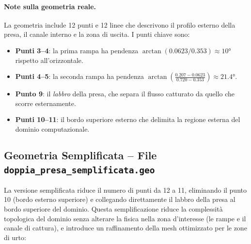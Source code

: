 \paragraph{Note sulla geometria reale.}
La geometria include 12 punti e 12 linee che descrivono il profilo esterno della presa, il
canale interno e la zona di uscita. I punti chiave sono:
\begin{itemize}
  \item \textbf{Punti 3--4}: la prima rampa ha pendenza
    $\arctan(0.0623/0.353) \approx 10°$ rispetto all'orizzontale.
  \item \textbf{Punti 4--5}: la seconda rampa ha pendenza
    $\arctan\!\left(\frac{0.207-0.0623}{0.720-0.353}\right) \approx 21.4°$.
  \item \textbf{Punto 9}: il \emph{labbro} della presa, che separa il flusso catturato da
    quello che scorre esternamente.
  \item \textbf{Punti 10--11}: il bordo superiore esterno che delimita la regione esterna
    del dominio computazionale.
\end{itemize}

\subsection{Geometria Semplificata -- File \texttt{doppia\_presa\_semplificata.geo}}
\label{sec:presa_semplificata}

La versione semplificata riduce il numero di punti da 12 a 11, eliminando il punto 10
(bordo esterno superiore) e collegando direttamente il labbro della presa al bordo superiore
del dominio. Questa semplificazione riduce la complessità topologica del dominio senza
alterare la fisica nella zona d'interesse (le rampe e il canale di cattura), e
introduce un raffinamento della mesh ottimizzato per le zone di urto:

